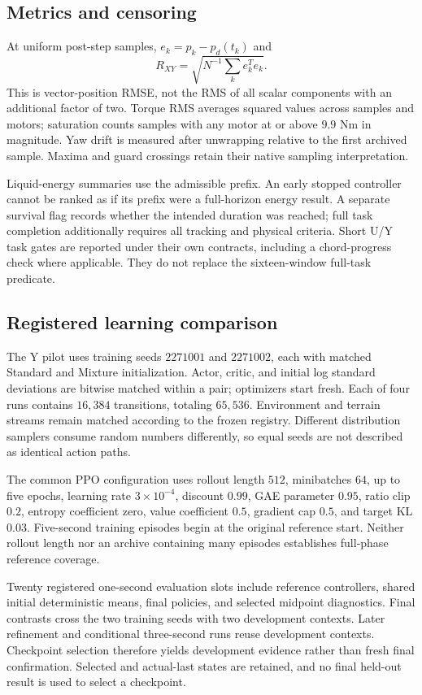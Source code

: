 \subsection{Metrics and censoring}
At uniform post-step samples, $e_k=p_k-p_d(t_k)$ and
\begin{equation}
 R_{XY}=\sqrt{N^{-1}\sum_k e_k^Te_k}.
\end{equation}
This is vector-position RMSE, not the RMS of all scalar components with an additional factor of two. Torque RMS averages squared values across samples and motors; saturation counts samples with any motor at or above $9.9$ Nm in magnitude. Yaw drift is measured after unwrapping relative to the first archived sample. Maxima and guard crossings retain their native sampling interpretation.

Liquid-energy summaries use the admissible prefix. An early stopped controller cannot be ranked as if its prefix were a full-horizon energy result. A separate survival flag records whether the intended duration was reached; full task completion additionally requires all tracking and physical criteria. Short U/Y task gates are reported under their own contracts, including a chord-progress check where applicable. They do not replace the sixteen-window full-task predicate.

\subsection{Registered learning comparison}
The Y pilot uses training seeds $2271001$ and $2271002$, each with matched Standard and Mixture initialization. Actor, critic, and initial log standard deviations are bitwise matched within a pair; optimizers start fresh. Each of four runs contains $16,384$ transitions, totaling $65,536$. Environment and terrain streams remain matched according to the frozen registry. Different distribution samplers consume random numbers differently, so equal seeds are not described as identical action paths.

The common PPO configuration uses rollout length $512$, minibatches $64$, up to five epochs, learning rate $3\times10^{-4}$, discount $0.99$, GAE parameter $0.95$, ratio clip $0.2$, entropy coefficient zero, value coefficient $0.5$, gradient cap $0.5$, and target KL $0.03$. Five-second training episodes begin at the original reference start. Neither rollout length nor an archive containing many episodes establishes full-phase reference coverage.

Twenty registered one-second evaluation slots include reference controllers, shared initial deterministic means, final policies, and selected midpoint diagnostics. Final contrasts cross the two training seeds with two development contexts. Later refinement and conditional three-second runs reuse development contexts. Checkpoint selection therefore yields development evidence rather than fresh final confirmation. Selected and actual-last states are retained, and no final held-out result is used to select a checkpoint.

